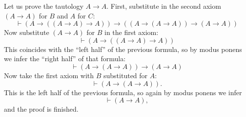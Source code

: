 \begin{exl}
Let us prove the tautology $A \to A$.
First, substitute in the second axiom $(A \to A)$ for $B$ and $A$ for $C$:
\[
\vdash (A \to ((A \to A) \to A)) \to ((A \to (A \to A)) \to (A \to A))
\]
Now substitute $(A \to A)$ for $B$ in the first axiom:
\[
\vdash (A \to ((A \to A) \to A))
\]
This coincides with the ``left half'' of the previous formula, so by modus ponens we infer the ``right half'' of that formula:
\[
\vdash (A \to (A \to A)) \to (A \to A)
\]
Now take the first axiom with $B$ substituted for $A$:
\[
\vdash (A \to (A \to A)).
\]
This is the left half of the previous formula, so again by modus ponens we infer
\[
\vdash (A \to A),
\]
and the proof is finished.
\end{exl}